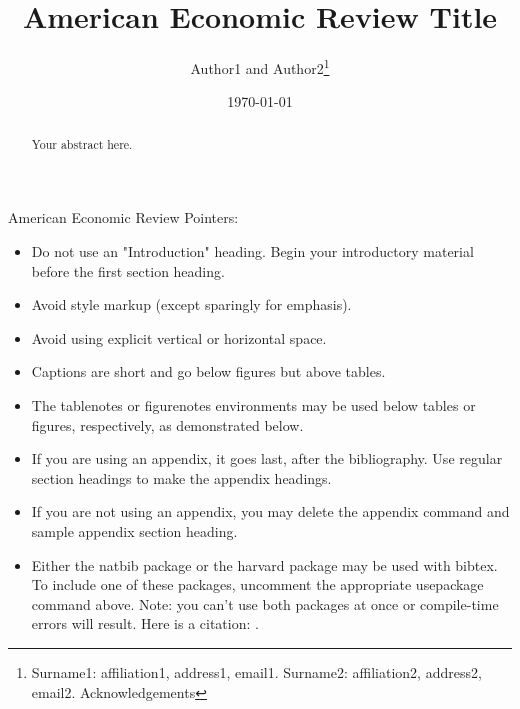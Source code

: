 \documentclass[AER,
finalmode,  %
]{AEA}
\begin{document}
\title{American Economic Review Title}
\author{Author1 and Author2\thanks{Surname1: affiliation1, address1, email1.
        Surname2: affiliation2, address2, email2. Acknowledgements}}
\date{\today}
\JEL{}

\begin{abstract}
    Your abstract here.
\end{abstract}


\maketitle

American Economic Review Pointers:

\begin{itemize}
    \item Do not use an "Introduction" heading. Begin your introductory material
          before the first section heading.
          
    \item Avoid style markup (except sparingly for emphasis).
          
    \item Avoid using explicit vertical or horizontal space.
          
    \item Captions are short and go below figures but above tables.
          
    \item The tablenotes or figurenotes environments may be used below tables
          or figures, respectively, as demonstrated below.
          
    \item If you are using an appendix, it goes last, after the bibliography.
          Use regular section headings to make the appendix headings.
          
    \item If you are not using an appendix, you may delete the appendix command
          and sample appendix section heading.
          
    \item Either the natbib package or the harvard package may be used with bibtex.
          To include one of these packages, uncomment the appropriate usepackage command
          above. Note: you can't use both packages at once or compile-time errors will result. Here is a citation: \cite{Lehe2024}.
          
\end{itemize}
\end{document}
